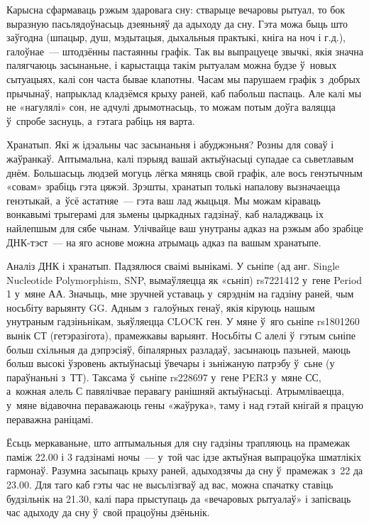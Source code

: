 Карысна сфармаваць рэжым здаровага сну: стварыце вечаровы рытуал, то бок выразную пасьлядоўнасьць дзеяньняў да адыходу да сну. Гэта можа быць што заўгодна (шпацыр, душ, мэдытацыя, дыхальныя практыкі, кніга на ноч і г.д.), галоўнае~--- штодзённы пастаянны графік. Так вы выпрацуеце звычкі, якія значна палягчаюць засынаньне, і карыстацца такім рытуалам можна будзе ў~новых сытуацыях, калі сон часта бывае клапотны. Часам мы парушаем графік з~добрых прычынаў, напрыклад кладзёмся крыху раней, каб пабольш паспаць. Але калі мы не «нагулялі» сон, не адчулі дрымотнасьць, то можам потым доўга валяцца ў~спробе заснуць, а~гэтага рабіць ня варта.

Хранатып. Які ж ідэальны час засынаньня і абуджэньня? Розны для соваў і жаўранкаў. Аптымальна, калі пэрыяд вашай актыўнасьці супадае са сьветлавым днём. Большасьць людзей могуць лёгка мяняць свой графік, але вось генэтычным «совам» зрабіць гэта цяжэй. Зрэшты, хранатып толькі напалову вызначаецца генэтыкай, а~ўсё астатняе~--- гэта ваш лад жыцьця. Мы можам кіраваць вонкавымі трыгерамі для зьмены цыркадных гадзінаў, каб наладжваць іх найлепшым для сябе чынам. Улічвайце ваш унутраны адказ на рэжым або зрабіце ДНК-тэст~--- на яго аснове можна атрымаць адказ па вашым хранатыпе.

Аналіз ДНК і хранатып. Падзялюся сваімі вынікамі. У сьніпе (ад анг. Single Nucleotide Polymorphism, SNP, вымаўляецца як «сьніп) rs7221412 у~гене Period 1 у~мяне АА. Значыць, мне зручней уставаць у~сярэднім на гадзіну раней, чым носьбіту варыянту GG. Адным з~галоўных генаў, якія кіруюць нашым унутраным гадзіньнікам, зьяўляецца CLOCK ген. У мяне ў~яго сьніпе rs1801260 вынік СТ (гетэразігота), прамежкавы варыянт. Носьбіты С алелі ў~гэтым сьніпе больш схільныя да дэпрэсіяў, біпалярных разладаў, засынаюць пазьней, маюць больш высокі ўзровень актыўнасьці ўвечары і зьніжаную патрэбу ў~сьне (у параўнаньні з~ТТ). Таксама ў~сьніпе rs228697 у~гене PER3 у~мяне СС, а~кожная алель С павялічвае перавагу ранішняй актыўнасьці. Атрымліваецца, у~мяне відавочна пераважаюць гены «жаўрука», таму і над гэтай кнігай я працую пераважна раніцамі.

Ёсьць меркаваньне, што аптымальныя для сну гадзіны трапляюць на прамежак паміж 22.00 і 3 гадзінамі ночы~--- у~той час ідзе актыўная выпрацоўка шматлікіх гармонаў. Разумна засыпаць крыху раней, адыходзячы да сну ў~прамежак з~22 да 23.00. Для таго каб гэты час не высьлізгваў ад вас, можна спачатку ставіць будзільнік на 21.30, калі пара прыступаць да «вечаровых рытуалаў» і запісваць час адыходу да сну ў~свой працоўны дзёньнік.

